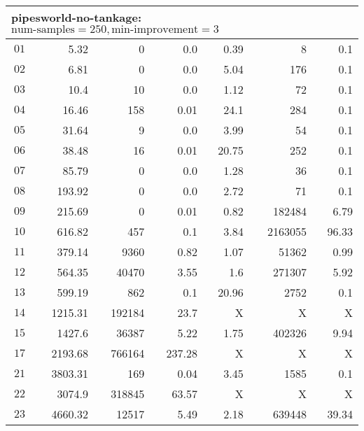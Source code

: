\begin{longtable}{|c||r|r|r||r|r|r|}
\multicolumn{7}{|l|}{pipesworld-no-tankage: $\text{num-samples}=250,\text{min-improvement}=3$}\\\hline
$01$ & 5.32 & 0 & 0.0 & 0.39 & 8 & 0.1 \\\hline
$02$ & 6.81 & 0 & 0.0 & 5.04 & 176 & 0.1 \\\hline
$03$ & 10.4 & 10 & 0.0 & 1.12 & 72 & 0.1 \\\hline
$04$ & 16.46 & 158 & 0.01 & 24.1 & 284 & 0.1 \\\hline
$05$ & 31.64 & 9 & 0.0 & 3.99 & 54 & 0.1 \\\hline
$06$ & 38.48 & 16 & 0.01 & 20.75 & 252 & 0.1 \\\hline
$07$ & 85.79 & 0 & 0.0 & 1.28 & 36 & 0.1 \\\hline
$08$ & 193.92 & 0 & 0.0 & 2.72 & 71 & 0.1 \\\hline
$09$ & 215.69 & 0 & 0.01 & 0.82 & 182484 & 6.79 \\\hline
$10$ & 616.82 & 457 & 0.1 & 3.84 & 2163055 & 96.33 \\\hline
$11$ & 379.14 & 9360 & 0.82 & 1.07 & 51362 & 0.99 \\\hline
$12$ & 564.35 & 40470 & 3.55 & 1.6 & 271307 & 5.92 \\\hline
$13$ & 599.19 & 862 & 0.1 & 20.96 & 2752 & 0.1 \\\hline
$14$ & 1215.31 & 192184 & 23.7 & X & X & X \\\hline
$15$ & 1427.6 & 36387 & 5.22 & 1.75 & 402326 & 9.94 \\\hline
$17$ & 2193.68 & 766164 & 237.28 & X & X & X \\\hline
$21$ & 3803.31 & 169 & 0.04 & 3.45 & 1585 & 0.1 \\\hline
$22$ & 3074.9 & 318845 & 63.57 & X & X & X \\\hline
$23$ & 4660.32 & 12517 & 5.49 & 2.18 & 639448 & 39.34 \\\hline


\end{longtable}

